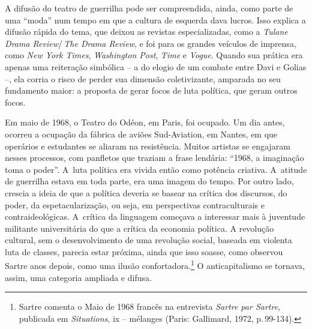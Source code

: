 {A difusão do teatro de guerrilha pode ser compreendida, ainda,
como parte de uma “moda” num tempo em que a cultura de esquerda dava
lucros. Isso explica a difusão rápida do tema, que deixou as revistas
especializadas, como a {\it Tulane Drama Review}/\,{\it The Drama Review},
e foi para os grandes veículos de imprensa, como {\it New York Times},
{\it Washington Post}, {\it Time} e {\it Vogue}. Quando sua prática era
apenas uma reiteração simbólica -- a do elogio de um combate entre Davi e
Golias --, ela corria o risco de perder sua dimensão coletivizante,
amparada no seu fundamento maior: a proposta de gerar focos de luta
política, que geram outros focos.

Em maio de 1968, o Teatro do Odéon, em Paris, foi ocupado. Um dia antes,
ocorreu a ocupação da fábrica de aviões Sud-Aviation, em Nantes, em que
operários e estudantes se aliaram na resistência. Muitos artistas se
engajaram nesses processos, com panfletos que traziam a frase lendária:
“1968, a imaginação toma o poder”. A~luta política era vivida então como
potência criativa. A~atitude de guerrilha estava em toda parte, era uma
imagem do tempo. Por outro lado, crescia a ideia de que a política
deveria se basear na crítica dos discursos, do poder, da
espetacularização, ou seja, em perspectivas contraculturais e
contraideológicas. A~crítica da linguagem começava a interessar mais à
juventude militante universitária do que a crítica da economia política.
A revolução cultural, sem o desenvolvimento de uma revolução social,
baseada em violenta luta de classes, parecia estar próxima, ainda que
isso soasse, como observou Sartre anos depois, como uma ilusão
confortadora.\footnote{Sartre comenta o Maio de 1968 francês na
  entrevista {\it Sartre par Sartre}, publicada em {\it Situations}, {\sc ix}
  -- mélanges (Paris: Gallimard, 1972, p.\,99-134).} O anticapitalismo se
tornava, assim, uma categoria ampliada e difusa.


}
